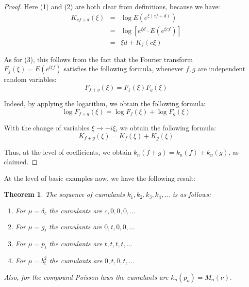 \documentclass[12pt]{amsbook}
\newtheorem{theorem}{Theorem}[chapter]
\begin{document}
\begin{proof}
Here (1) and (2) are both clear from definitions, because we have:
\begin{eqnarray*}
K_{cf+d}(\xi)
&=&\log E(e^{\xi(cf+d)})\\
&=&\log[e^{\xi d}\cdot E(e^{\xi cf})]\\
&=&\xi d+K_f(c\xi)
\end{eqnarray*}

As for (3), this follows from the fact that the Fourier transform $F_f(\xi)=E(e^{i\xi f})$ satisfies the following formula, whenever $f,g$ are independent random variables:
$$F_{f+g}(\xi)=F_f(\xi)F_g(\xi)$$

Indeed, by applying the logarithm, we obtain the following formula:
$$\log F_{f+g}(\xi)=\log F_f(\xi)+\log F_g(\xi)$$

With the change of variables $\xi\to-i\xi$, we obtain the following formula:
$$K_{f+g}(\xi)=K_f(\xi)+K_g(\xi)$$

Thus, at the level of coefficients, we obtain $k_n(f+g)=k_n(f)+k_n(g)$, as claimed.
\end{proof}

At the level of basic examples now, we have the following result:

\begin{theorem}
The sequence of cumulants $k_1,k_2,k_3,k_4,\ldots$ is as follows:
\begin{enumerate}
\item For $\mu=\delta_c$ the cumulants are $c,0,0,0,\ldots$

\item For $\mu=g_t$ the cumulants are $0,t,0,0,\ldots$

\item For $\mu=p_t$ the cumulants are $t,t,t,t,\ldots$

\item For $\mu=b_t^2$ the cumulants are $0,t,0,t,\ldots$
\end{enumerate}
Also, for the compound Poisson laws the cumulants are $k_n(p_\nu)=M_n(\nu)$.
\end{theorem}
\end{document}
